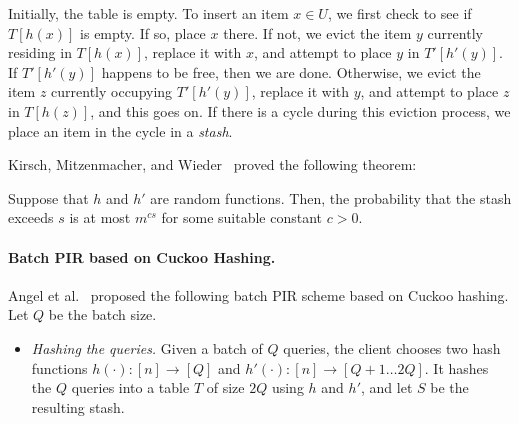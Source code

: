 {Initially, the table is empty. To insert an item $x \in U$, 
we first check to see if $T[h(x)]$ is empty. If so, place $x$ there. 
If not, we evict the item $y$ currently residing
in $T[h(x)]$, replace it with $x$, and attempt
to place $y$ in $T'[h'(y)]$. 
If $T'[h'(y)]$ happens to be free, then we are done. 
Otherwise, we evict the item $z$  
currently occupying $T'[h'(y)]$, replace it with $y$, and attempt to place
$z$ in $T[h(z)]$, and this goes on.
If there is a cycle during this eviction process, we place
an item in the cycle  
in a {\it stash}.


Kirsch, Mitzenmacher, and Wieder~\cite{cuckoostash} proved the following theorem:
\begin{theorem}
Suppose that $h$ and $h'$ are random functions.
Then, 
the probability that the stash exceeds $s$ is at most
$m^{c s}$
for some suitable constant $c > 0$.
\end{theorem}


    
\paragraph{Batch PIR based on Cuckoo Hashing.}   
Angel et al.~\cite{angel2018pir} 
proposed the following batch PIR scheme based on Cuckoo hashing. 
Let $Q$ be the batch size. 

\begin{itemize}[leftmargin=7mm]
\item 
{\it Hashing the queries.}
Given a batch of $Q$ queries, the
client chooses two hash functions 
 $h(\cdot): [n] \rightarrow [Q]$ and 
$h'(\cdot): [n] \rightarrow [Q+1 \ldots 2Q]$. 
It hashes the $Q$ queries 
into a table $T$ of size $2Q$ using $h$ and $h'$, 
and let $S$ be the resulting stash.  


\end{itemize}}
